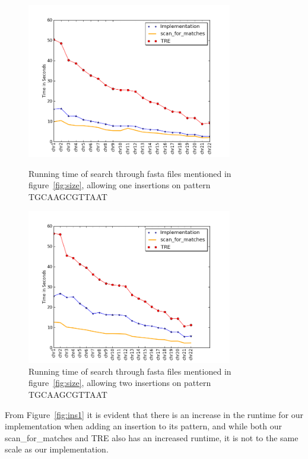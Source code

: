 \begin{figure}[h!]
\begin{minipage}[b]{0.5\linewidth}
\centering
\includegraphics[width=0.8\textwidth]{Benchmarking/1ins.png}
\caption{Running time of search through fasta files mentioned in figure~\ref{fig:size},  allowing one insertions on pattern TGCAAGCGTTAAT}
\label{fig:ins1}
\end{minipage}
\hspace{0.25cm}
\begin{minipage}[b]{0.5\linewidth}
\centering
\includegraphics[width=0.8\textwidth]{Benchmarking/2ins.png}
\caption{Running time of search through fasta files mentioned in figure~\ref{fig:size},  allowing two insertions on pattern TGCAAGCGTTAAT}
\label{fig:ins2}
\end{minipage}
\end{figure}


From Figure~\ref{fig:ins1} it is evident that there is an increase in the runtime for our implementation when adding an insertion to its pattern, and while both our scan\_for\_matches and TRE also has an increased runtime, it is not to the same scale as our implementation.

